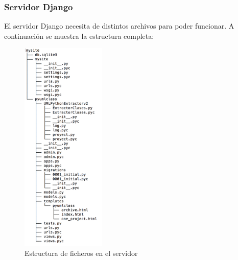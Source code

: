 \documentclass[a4paper, 12pt]{book}
\begin{document}
\subsubsection{Servidor Django}
\label{subsubsec:server}
El servidor Django necesita de distintos archivos para poder funcionar. A continuación se muestra la estructura
completa:

\begin{figure}[htb]
  \centering
  \includegraphics[width=4cm, keepaspectratio]{img/estructura-server}
  \caption{Estructura de ficheros en el servidor}
  \label{fig:estructura-server}
\end{figure}
\end{document}
